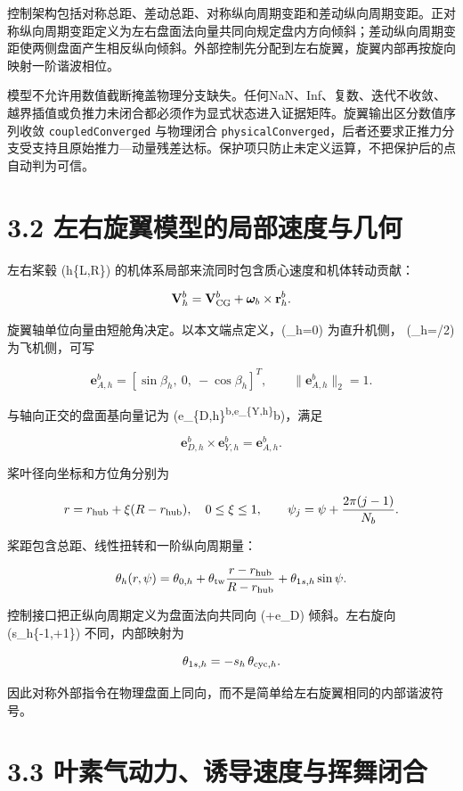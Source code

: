 \documentclass[UTF8,11pt,oneside,openany,fontset=windows]{ctexbook}
\begin{document}
控制架构包括对称总距、差动总距、对称纵向周期变距和差动纵向周期变距。正对称纵向周期变距定义为左右盘面法向量共同向规定盘内方向倾斜；差动纵向周期变距使两侧盘面产生相反纵向倾斜。外部控制先分配到左右旋翼，旋翼内部再按旋向映射一阶谐波相位。

模型不允许用数值截断掩盖物理分支缺失。任何NaN、Inf、复数、迭代不收敛、越界插值或负推力未闭合都必须作为显式状态进入证据矩阵。旋翼输出区分数值序列收敛
\texttt{coupledConverged} 与物理闭合
\texttt{physicalConverged}，后者还要求正推力分支受支持且原始推力---动量残差达标。保护项只防止未定义运算，不把保护后的点自动判为可信。

\section{3.2
左右旋翼模型的局部速度与几何}\label{ux5de6ux53f3ux65cbux7ffcux6a21ux578bux7684ux5c40ux90e8ux901fux5ea6ux4e0eux51e0ux4f55}

左右桨毂 (h\in\{L,R\}) 的机体系局部来流同时包含质心速度和机体转动贡献：

\[
\mathbf V_h^b=\mathbf V_{\rm CG}^b+\boldsymbol\omega_b\times\mathbf r_h^b.
\]

旋翼轴单位向量由短舱角决定。以本文端点定义，(\beta\_h=0) 为直升机侧，
(\beta\_h=\pi/2) 为飞机侧，可写

\[
\mathbf e_{A,h}^b=[\sin\beta_h,\ 0,\ -\cos\beta_h]^T,\qquad
\|\mathbf e_{A,h}^b\|_2=1.
\]

与轴向正交的盘面基向量记为
(\mathbf e\_\{D,h\}\textsuperscript{b,\mathbf e\_\{Y,h\}}b)，满足

\[
\mathbf e_{D,h}^b\times\mathbf e_{Y,h}^b=\mathbf e_{A,h}^b.
\]

桨叶径向坐标和方位角分别为

\[
r=r_{\rm hub}+\xi(R-r_{\rm hub}),\quad 0\le\xi\le1,\qquad
\psi_j=\psi+\frac{2\pi(j-1)}{N_b}.
\]

桨距包含总距、线性扭转和一阶纵向周期量：

\[
\theta_h(r,\psi)=\theta_{0,h}+\theta_{\rm tw}\frac{r-r_{\rm hub}}{R-r_{\rm hub}}
+\theta_{1s,h}\sin\psi .
\]

控制接口把正纵向周期定义为盘面法向共同向 (+\mathbf e\_D) 倾斜。左右旋向
(s\_h\in\{-1,+1\}) 不同，内部映射为

\[
\theta_{1s,h}=-s_h\,\theta_{{\rm cyc},h}.
\]

因此对称外部指令在物理盘面上同向，而不是简单给左右旋翼相同的内部谐波符号。

\section{3.3
叶素气动力、诱导速度与挥舞闭合}\label{ux53f6ux7d20ux6c14ux52a8ux529bux8bf1ux5bfcux901fux5ea6ux4e0eux6325ux821eux95edux5408}
\end{document}
